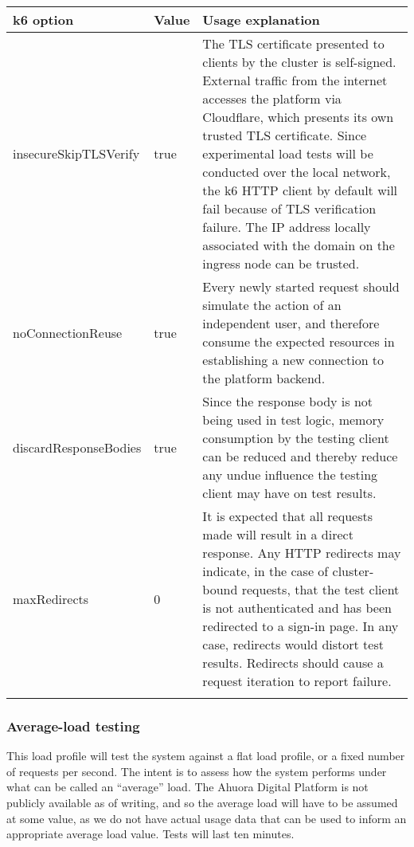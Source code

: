 \begin{tabularx}{\textwidth}{|p{}|p{}|X|}
    \hline
    \textbf{k6 option} & \textbf{Value} & \textbf{Usage explanation}  \\ \hline
    insecureSkipTLSVerify & true & The TLS certificate presented to clients by the cluster is self-signed. External traffic from the internet accesses the platform via Cloudflare, which presents its own trusted TLS certificate. Since experimental load tests will be conducted over the local network, the k6 HTTP client by default will fail because of TLS verification failure. The IP address locally associated with the domain on the ingress node can be trusted. \\ \hline
    noConnectionReuse & true & Every newly started request should simulate the action of an independent user, and therefore consume the expected resources in establishing a new connection to the platform backend.  \\ \hline
    discardResponseBodies & true & Since the response body is not being used in test logic, memory consumption by the testing client can be reduced and thereby reduce any undue influence the testing client may have on test results. \\ \hline
    maxRedirects & 0 & It is expected that all requests made will result in a direct response. Any HTTP redirects may indicate, in the case of cluster-bound requests, that the test client is not authenticated and has been redirected to a sign-in page. In any case, redirects would distort test results. Redirects should cause a request iteration to report failure. \\ \hline

    \caption{Base options set for k6 load tests}
    \label{table:k6-load-test-options}
\end{tabularx}

\subsubsection{Average-load testing}

This load profile will test the system against a flat load profile, or a fixed number of requests per second. The intent is to assess how the system performs under what can be called an ``average'' load. The Ahuora Digital Platform is not publicly available as of writing, and so the average load will have to be assumed at some value, as we do not have actual usage data that can be used to inform an appropriate average load value. Tests will last ten minutes.


